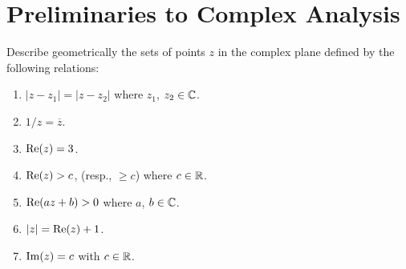 \section{Preliminaries to Complex Analysis}

\begin{exercise}
Describe geometrically the sets of points $z$ in the complex plane defined by the
following relations:
\begin{enumerate}[label=(\alph*)]
    \item $|z - z_1| = |z - z_2|$ where $z_1$, $z_2 \in \mathbb{C}$.
    \item $1/z = \overline{z}$.
    \item $\operatorname{Re}(z) = 3$.
    \item $\operatorname{Re}(z) > c$, (resp., $\geq c$) where $c \in \mathbb{R}$.
    \item $\operatorname{Re}(az + b) > 0$ where $a$, $b \in \mathbb{C}$.
    \item $|z| = \operatorname{Re}(z) + 1$.
    \item $\operatorname{Im}(z) = c$ with $c \in \mathbb{R}$.
\end{enumerate}

\end{exercise}